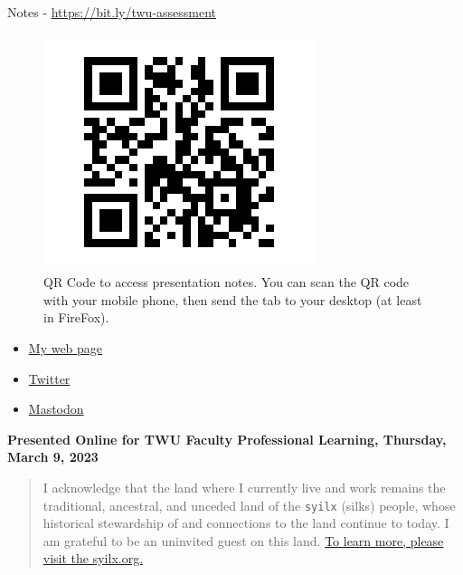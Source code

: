 \documentclass[
]{book}
\providecommand{\tightlist}{%
  \setlength{\itemsep}{0pt}\setlength{\parskip}{0pt}}
\begin{document}
Notes - \url{https://bit.ly/twu-assessment}

\begin{figure}
\centering
\includegraphics{assets/twu-asmt/qr-slides.png}
\caption{QR Code to access presentation notes. You can scan the QR code with your mobile phone, then send the tab to your desktop (at least in FireFox).}
\end{figure}

\begin{itemize}
\tightlist
\item
  \href{https://cmad.land}{My web page}\\
\item
  \href{https://twitter.com/colinmadland}{Twitter}\\
\item
  \href{https://scholar.social/web/@Cmadland}{Mastodon}
\end{itemize}

\textbf{Presented Online for TWU Faculty Professional Learning, Thursday, March 9, 2023}

\begin{quote}
I acknowledge that the land where I currently live and work remains the traditional, ancestral, and unceded land of the \texttt{syilx} (silks) people, whose historical stewardship of and connections to the land continue to today. I am grateful to be an uninvited guest on this land. \href{https:/syilx.org}{To learn more, please visit the syilx.org.}
\end{quote}
\end{document}
